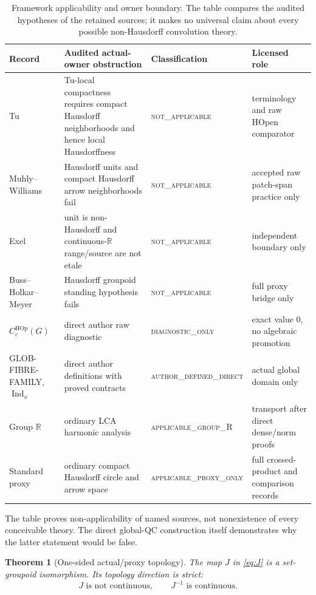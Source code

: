 \documentclass[11pt]{article}
\newtheorem{theorem}{Theorem}[section]
\theoremstyle{definition}
\newcommand{\R}{\mathbb R}
\newcommand{\CHOp}{C_c^{\mathrm{HOp}}}
\newcommand{\Ind}{\operatorname{Ind}}
\newcommand{\NA}{\textsc{not\_applicable}}
\newcommand{\Diag}{\textsc{diagnostic\_only}}
\begin{document}
\begin{table}[htbp]
\centering\small
\caption{Framework applicability and owner boundary.  The table compares
the audited hypotheses of the retained sources; it makes no universal claim
about every possible non-Hausdorff convolution theory.}
\label{tab:framework-applicability}
\begin{tabularx}{\textwidth}{P{0.19\textwidth}P{0.30\textwidth}P{0.20\textwidth}Y}
\toprule
Record & Audited actual-owner obstruction & Classification & Licensed role \\
\midrule
Tu \cite{Tu2004} & Tu-local compactness requires compact Hausdorff neighborhoods and hence local Hausdorffness & \NA & terminology and raw HOpen comparator \\
Muhly--Williams \cite{MuhlyWilliams2008} & Hausdorff units and compact Hausdorff arrow neighborhoods fail & \NA & accepted raw patch-span practice only \\
Exel \cite{Exel2011} & unit is non-Hausdorff and continuous-$\R$ range/source are not etale & \NA & independent boundary only \\
Buss--Holkar--Meyer \cite{BussHolkarMeyer2018} & Hausdorff groupoid standing hypothesis fails & \NA & full proxy bridge only \\
$\CHOp(G)$ & direct author raw diagnostic & \Diag & exact value $0$, no algebraic promotion \\
GLOB-FIBRE-FAMILY, $\Ind_x$ & direct author definitions with proved contracts & \textsc{author\_defined\_\allowbreak direct} & actual global domain only \\
Group $\R$ & ordinary LCA harmonic analysis & \textsc{applicable\_\allowbreak group\_R} & transport after direct dense/norm proofs \\
Standard proxy & ordinary compact Hausdorff circle and arrow space & \textsc{applicable\_\allowbreak proxy\_only} & full crossed-product and comparison records \\
\bottomrule
\end{tabularx}
\end{table}

The table proves non-applicability of named sources, not nonexistence of every
conceivable theory.  The direct global-QC construction itself demonstrates
why the latter statement would be false.

\begin{theorem}[One-sided actual/proxy topology]
\label{thm:J}
The map $J$ in \cref{eq:J} is a set-groupoid isomorphism.  Its topology
direction is strict:
\begin{equation}
 J\text{ is not continuous},\qquad J^{-1}\text{ is continuous}.
 \label{eq:J-direction}
\end{equation}
\end{theorem}
\end{document}
